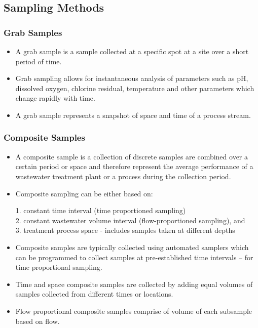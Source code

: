 \subsection{Sampling Methods}
\subsubsection{Grab Samples}
				\begin{itemize}
					\item A grab sample is a sample collected at a specific spot at a site over a short period of time.  
					\item Grab sampling allows for instantaneous analysis of parameters such as pH, dissolved oxygen, chlorine residual, temperature and other parameters which change rapidly with time.
					\item A grab sample represents a snapshot of space and time of a process stream.
					\end{itemize}
\subsubsection{Composite Samples}
				\begin{itemize}
					\item A composite sample is a collection of discrete samples are combined over a certain period or space and therefore represent the average performance of a wastewater treatment plant or a process during the collection period.\\  
					\item Composite sampling can be either based on:
					      
					      1. constant time interval (time proportioned sampling)\\
					      2. constant wastewater volume interval (flow-proportioned sampling), and\\
					      3. treatment process space - includes samples taken at different depths\\
					      
					\item Composite samples are typically collected using automated samplers which can be programmed to collect samples at pre-established time intervals – for time proportional sampling.
					\item Time and space composite samples are collected by adding equal volumes of samples collected from different times or locations.  
					\item Flow proportional composite samples comprise of volume of each subsample based on flow.\\  
				\end{itemize}
				
